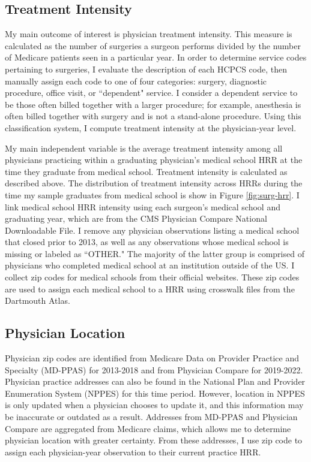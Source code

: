 \subsection{Treatment Intensity}
My main outcome of interest is physician treatment intensity. This measure is calculated as the number of surgeries a surgeon performs divided by the number of Medicare patients seen in a particular year. In order to determine service codes pertaining to surgeries, I evaluate the description of each HCPCS code, then manually assign each code to one of four categories: surgery, diagnostic procedure, office visit, or ``dependent" service. I consider a dependent service to be those often billed together with a larger procedure; for example, anesthesia is often billed together with surgery and is not a stand-alone procedure.  Using this classification system, I compute treatment intensity at the physician-year level.

My main independent variable is the average treatment intensity among all physicians practicing within a graduating physician's medical school HRR at the time they graduate from medical school. Treatment intensity is calculated as described above. The distribution of treatment intensity across HRRs during the time my sample graduates from medical school is show in Figure \ref{fig:surg-hrr}. I link medical school HRR intensity using each surgeon's medical school and graduating year, which are from the CMS Physician Compare National Downloadable File. I remove any physician observations listing a medical school that closed prior to 2013, as well as any observations whose medical school is missing or labeled as ``OTHER." The majority of the latter group is comprised of physicians who completed medical school at an institution outside of the US. I collect zip codes for medical schools from their official websites. These zip codes are used to assign each medical school to a HRR using crosswalk files from the Dartmouth Atlas.



\subsection{Physician Location}
Physician zip codes are identified from Medicare Data on Provider Practice and Specialty (MD-PPAS) for 2013-2018 and from Physician Compare for 2019-2022. Physician practice addresses can also be found in the National Plan and Provider Enumeration System (NPPES) for this time period. However, location in NPPES is only updated when a physician chooses to update it, and this information may be inaccurate or outdated as a result. Addresses from MD-PPAS and Physician Compare are aggregated from Medicare claims, which allows me to determine physician location with greater certainty. From these addresses, I use zip code to assign each physician-year observation to their current practice HRR. 

